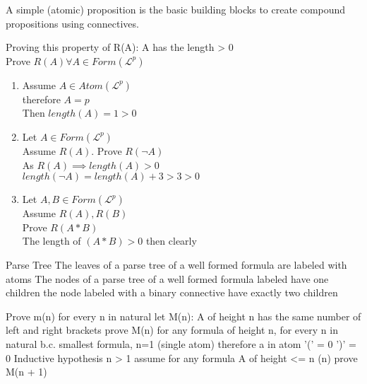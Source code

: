 \documentclass[12pt,oneside,fleqn]{article}
\theoremstyle{definition}
\newcommand{\Lp}{\mathcal{L}^p}
\begin{document}
A simple (atomic) proposition is the basic building blocks to create compound propositions using connectives.

Proving this property of R(A): A has the length > 0 \\
Prove $R(A) \forall A \in Form(\Lp)$
\begin{enumerate}
\item Assume $A \in Atom(\Lp)$ \\
therefore $A = p$ \\
Then $length(A) = 1 > 0$ \\
\item Let $A \in Form(\Lp)$ \\
Assume $R(A)$. Prove $R(\neg A)$ \\
As $R(A) \implies length(A) > 0$ \\
$length(\neg A) = length(A) + 3 > 3 > 0$ \\
\item Let $A, B \in Form(\Lp)$ \\
Assume $R(A), R(B)$ \\
Prove $R(A * B)$ \\
The length of $(A * B) > 0$ then clearly
\end{enumerate}

Parse Tree
The leaves of a parse tree of a well formed formula are labeled with atoms
The nodes of a parse tree of a well formed formula labeled have one children
the node labeled with a binary connective have exactly two children

Prove m(n) for every n in natural
let M(n): A of height n has the same number of left and right brackets
prove M(n) for any formula of height n, for every n in natural
b.c. smallest formula, n=1 (single atom)
therefore a in atom
'(' = 0
')' = 0
Inductive hypothesis
n > 1
assume for any formula A of height <= n (n) prove M(n + 1)
\end{document}
